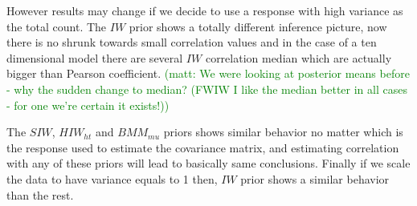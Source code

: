 \documentclass[a4paper]{article}
\newcommand{\matt}[1]{\textcolor{green}{(matt: #1)}}
\begin{document}
However results may change if we decide to use a response with high variance as the total count. The $IW$ prior shows a totally different inference picture, now there is no shrunk towards small correlation values and in the case of a ten dimensional model there are several $IW$ correlation median which are actually bigger than Pearson coefficient. \matt{We were looking at posterior means before - why the sudden change to median? (FWIW I like the median better in all cases - for one we're certain it exists!)}

The $SIW$, $HIW_{ht}$ and $BMM_{mu}$ priors shows similar behavior no matter which is the response used to estimate the covariance matrix, and estimating correlation with any of these priors will lead to basically same conclusions. Finally if we scale the data to have variance equals to 1 then, $IW$ prior shows a similar behavior than the rest.

\end{document}
